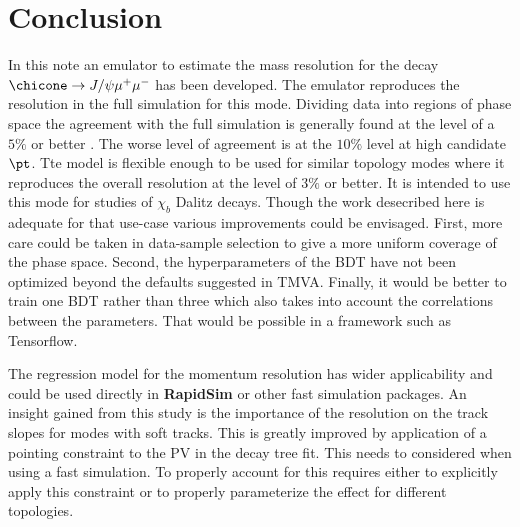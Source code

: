 \section{Conclusion}
\label{sec:conclusion}
%
In this note an emulator to estimate the mass resolution for the decay
$\chicone \rightarrow J/\psi \mu^+ \mu^-$ has been developed. The
emulator reproduces the resolution in the full simulation
 for this mode. Dividing data into regions of phase space
the agreement with the full simulation is generally found at the level
of a $5 \%$ or better . The worse level of agreement is at the $10 \%$ level
at high candidate $\pt$.  Tte model is flexible enough to
be used for similar topology modes where it reproduces the overall
resolution at the level of $3 \%$ or better. It is intended to use
this mode for studies of $\chi_b$ Dalitz decays. Though the work
desecribed here is adequate for that use-case various improvements
could be envisaged. First, more care could be taken in data-sample
selection to give a more uniform coverage of the phase space. Second,
the hyperparameters of the BDT have not been optimized beyond the
defaults suggested in TMVA. Finally, it would be better to train one
BDT rather than three which also takes into account the correlations
between the parameters. That would be possible in a framework such as
Tensorflow.

The regression model for the momentum resolution has wider
applicability and could be used directly in \textbf{RapidSim} or other
fast simulation packages. An insight gained from this study is the
importance of the resolution on the track slopes for modes with soft
tracks. This is greatly improved by application of a pointing constraint
to the PV in the decay tree fit.  This needs to considered when using
a fast simulation. To properly account for this requires either to
explicitly apply this constraint or to properly parameterize the
effect for different topologies.



\clearpage